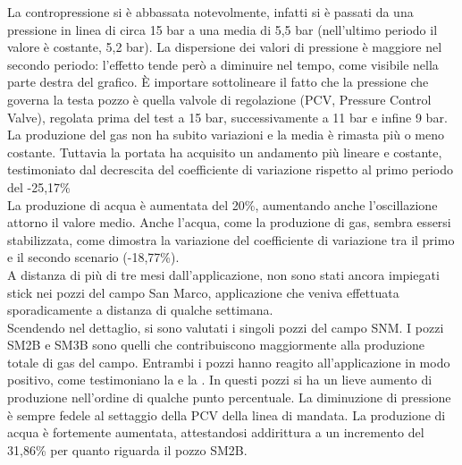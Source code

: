 La contropressione si è abbassata notevolmente, infatti si è passati da una pressione in linea di circa 15 bar a una media di 5,5 bar (nell'ultimo periodo il valore è costante, 5,2 bar). La dispersione dei valori di pressione è maggiore nel secondo periodo:  l'effetto tende però a diminuire nel tempo, come visibile nella parte destra del grafico. È importare sottolineare il fatto che la pressione che governa la testa pozzo è quella valvole di regolazione (PCV, Pressure Control Valve), regolata prima del test a 15 bar, successivamente a 11 bar e infine 9 bar.\\
La produzione del gas non ha subito variazioni e la media è rimasta più o meno costante. Tuttavia la portata ha acquisito un andamento più lineare e costante, testimoniato dal decrescita del coefficiente di variazione rispetto al primo periodo del -25,17\% \\
La produzione di acqua è aumentata del 20\%, aumentando anche l’oscillazione attorno il valore medio. Anche l'acqua, come la produzione di gas, sembra essersi stabilizzata, come dimostra la variazione del coefficiente di variazione tra il primo e il secondo scenario (-18,77\%).\\
A distanza di più di tre mesi dall'applicazione, non sono stati ancora impiegati stick nei pozzi del campo San Marco, applicazione che veniva effettuata sporadicamente a distanza di qualche settimana.\\
Scendendo nel dettaglio, si sono valutati i singoli pozzi del campo SNM. I pozzi SM2B e SM3B sono quelli che contribuiscono maggiormente alla produzione totale di gas del campo. Entrambi i pozzi hanno reagito all'applicazione in modo positivo, come testimoniano la  e la . In questi pozzi si ha un lieve aumento di produzione nell'ordine di qualche punto percentuale. La diminuzione di pressione è sempre fedele al settaggio della PCV della linea di mandata. La produzione di acqua è fortemente aumentata, attestandosi addirittura a un incremento del 31,86\% per quanto riguarda il pozzo SM2B.

